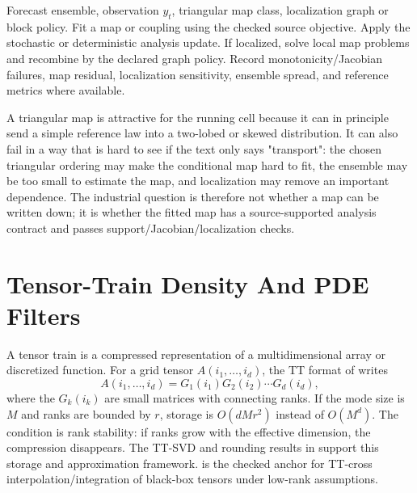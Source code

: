\begin{algorithm}
\caption{Triangular-map ensemble filtering step}
\label{alg:bf-hd-map-filter}
\begin{algorithmic}[1]
\Require Forecast ensemble, observation \(y_t\), triangular map class,
  localization graph or block policy.
\State Fit a map or coupling using the checked source objective.
\State Apply the stochastic or deterministic analysis update.
\State If localized, solve local map problems and recombine by the declared
  graph policy.
\State Record monotonicity/Jacobian failures, map residual, localization
  sensitivity, ensemble spread, and reference metrics where available.
\end{algorithmic}
\end{algorithm}

A triangular map is attractive for the running cell because it can in principle
send a simple reference law into a two-lobed or skewed distribution.  It can
also fail in a way that is hard to see if the text only says "transport": the
chosen triangular ordering may make the conditional map hard to fit, the
ensemble may be too small to estimate the map, and localization may remove an
important dependence.  The industrial question is therefore not whether a map
can be written down; it is whether the fitted map has a source-supported
analysis contract and passes support/Jacobian/localization checks.

\section{Tensor-Train Density And PDE Filters}
\label{sec:bf-hd-tt-pde}

A tensor train is a compressed representation of a multidimensional array or
discretized function.  For a grid tensor \(A(i_1,\ldots,i_d)\), the TT format
of \citet{oseledets2011tt} writes
\begin{equation}
  A(i_1,\ldots,i_d)=G_1(i_1)G_2(i_2)\cdots G_d(i_d),
  \label{eq:bf-hd-tt-format}
\end{equation}
where the \(G_k(i_k)\) are small matrices with connecting ranks.  If the mode
size is \(M\) and ranks are bounded by \(r\), storage is \(O(dMr^2)\) instead
of \(O(M^d)\).  The condition is rank stability: if ranks grow with the
effective dimension, the compression disappears.  The TT-SVD and rounding
results in \citet{oseledets2011tt} support this storage and approximation
framework.  \citet{oseledets2010ttcross} is the checked anchor for TT-cross
interpolation/integration of black-box tensors under low-rank assumptions.

